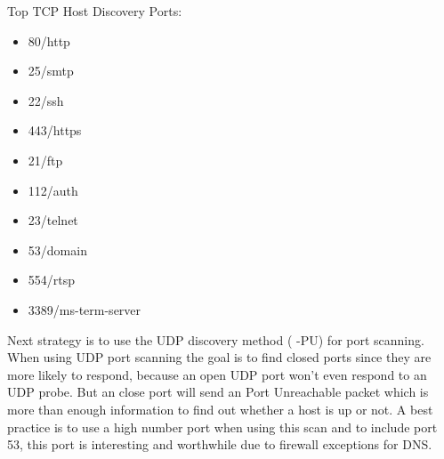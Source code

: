 \documentclass[times, utf8, seminar,english]{fer}
\begin{document}
\newline Top TCP Host Discovery Ports:
\begin{itemize}
	\item 80/http
	\item 25/smtp
	\item 22/ssh
	\item 443/https
	\item 21/ftp
	\item 112/auth
	\item 23/telnet
	\item 53/domain
	\item 554/rtsp
	\item 3389/ms-term-server
\end{itemize}

Next strategy is to use the UDP discovery method ( -PU) for port scanning. When using UDP port scanning the goal is to find closed ports since they are more likely to respond, because an open UDP port won't even respond to an UDP probe. But an close port will send an Port Unreachable packet which is more than enough information to find out whether a host is up or not. A best practice is to use a high number port when using this scan and to include port 53, this port is interesting and worthwhile due to firewall exceptions for DNS.
\newpage
\end{document}
